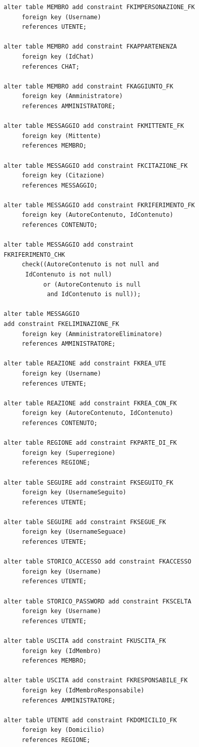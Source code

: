 \documentclass[a4paper,12pt]{report}
\begin{document}
\begin{lstlisting}
  alter table MEMBRO add constraint FKIMPERSONAZIONE_FK
       foreign key (Username)
       references UTENTE;
  
  alter table MEMBRO add constraint FKAPPARTENENZA
       foreign key (IdChat)
       references CHAT;
  
  alter table MEMBRO add constraint FKAGGIUNTO_FK
       foreign key (Amministratore)
       references AMMINISTRATORE;
  
  alter table MESSAGGIO add constraint FKMITTENTE_FK
       foreign key (Mittente)
       references MEMBRO;
  
  alter table MESSAGGIO add constraint FKCITAZIONE_FK
       foreign key (Citazione)
       references MESSAGGIO;
  
  alter table MESSAGGIO add constraint FKRIFERIMENTO_FK
       foreign key (AutoreContenuto, IdContenuto)
       references CONTENUTO;
  
  alter table MESSAGGIO add constraint 
  FKRIFERIMENTO_CHK
       check((AutoreContenuto is not null and
        IdContenuto is not null)
             or (AutoreContenuto is null
              and IdContenuto is null)); 
  
  alter table MESSAGGIO 
  add constraint FKELIMINAZIONE_FK
       foreign key (AmministratoreEliminatore)
       references AMMINISTRATORE;
  
  alter table REAZIONE add constraint FKREA_UTE
       foreign key (Username)
       references UTENTE;
  
  alter table REAZIONE add constraint FKREA_CON_FK
       foreign key (AutoreContenuto, IdContenuto)
       references CONTENUTO;
  
  alter table REGIONE add constraint FKPARTE_DI_FK
       foreign key (Superregione)
       references REGIONE;
  
  alter table SEGUIRE add constraint FKSEGUITO_FK
       foreign key (UsernameSeguito)
       references UTENTE;
  
  alter table SEGUIRE add constraint FKSEGUE_FK
       foreign key (UsernameSeguace)
       references UTENTE;
  
  alter table STORICO_ACCESSO add constraint FKACCESSO
       foreign key (Username)
       references UTENTE;
  
  alter table STORICO_PASSWORD add constraint FKSCELTA
       foreign key (Username)
       references UTENTE;
  
  alter table USCITA add constraint FKUSCITA_FK
       foreign key (IdMembro)
       references MEMBRO;
  
  alter table USCITA add constraint FKRESPONSABILE_FK
       foreign key (IdMembroResponsabile)
       references AMMINISTRATORE;
  
  alter table UTENTE add constraint FKDOMICILIO_FK
       foreign key (Domicilio)
       references REGIONE;
  
  
\end{lstlisting}
\end{document}
